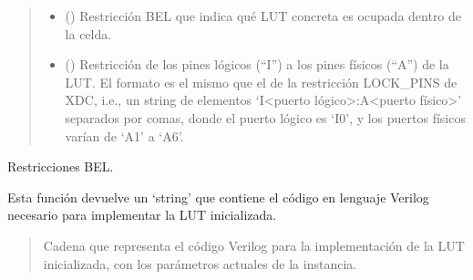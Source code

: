 \documentclass[letterpaper,10pt,english]{sphinxmanual}
\begin{document}
\begin{fulllineitems}
\begin{quote}
\begin{description}
\begin{itemize}
\item {} 
\sphinxAtStartPar
{} (\sphinxstyleliteralemphasis{\sphinxupquote{, }}\sphinxstyleliteralemphasis{\sphinxupquote{, }}\sphinxstyleliteralemphasis{\sphinxupquote{, }}) \textendash{} Restricción BEL que indica qué LUT concreta es ocupada dentro de la celda.

\item {} 
\sphinxAtStartPar
{} () \textendash{} Restricción de los pines lógicos (“I”) a los pines físicos (“A”) de la LUT. El formato es el mismo que el de la restricción LOCK\_PINS de XDC, i.e., un string de elementos ‘I\textless{}puerto lógico\textgreater{}:A\textless{}puerto físico\textgreater{}’ separados por comas, donde el puerto lógico es ‘I0’, y los puertos físicos varían de ‘A1’ a ‘A6’.

\end{itemize}

\end{description}\end{quote}

\begin{fulllineitems}
\label{\detokenize{fpga:fpga.Lut4.bel}}
\pysigstartsignatures
{}
\pysigstopsignatures
\sphinxAtStartPar
Restricciones BEL.

\end{fulllineitems}


\begin{fulllineitems}
\label{\detokenize{fpga:fpga.Lut4.impl}}
\pysigstartsignatures
{}
\pysigstopsignatures
\sphinxAtStartPar
Esta función devuelve un ‘string’ que contiene el código en lenguaje Verilog necesario para implementar la LUT inicializada.
\begin{quote}\begin{description}
\sphinxAtStartPar
Cadena que representa el código Verilog para la implementación de la LUT inicializada, con los parámetros actuales de la instancia.


\end{description}
\end{quote}
\end{fulllineitems}
\end{fulllineitems}
\end{document}
